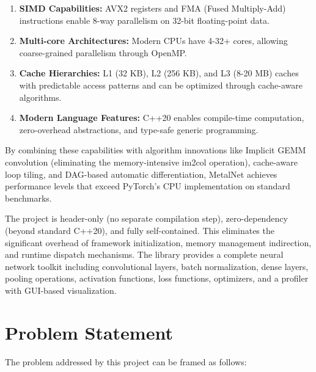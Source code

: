 \documentclass[12pt,oneside,a4paper]{report}
\begin{document}
\begin{enumerate}
    \item \textbf{SIMD Capabilities:} AVX2 registers and FMA (Fused Multiply-Add) instructions enable 8-way parallelism on 32-bit floating-point data.
    \item \textbf{Multi-core Architectures:} Modern CPUs have 4-32+ cores, allowing coarse-grained parallelism through OpenMP.
    \item \textbf{Cache Hierarchies:} L1 (32 KB), L2 (256 KB), and L3 (8-20 MB) caches with predictable access patterns and can be optimized through cache-aware algorithms.
    \item \textbf{Modern Language Features:} C++20 enables compile-time computation, zero-overhead abstractions, and type-safe generic programming.
\end{enumerate}

By combining these capabilities with algorithm innovations like Implicit GEMM convolution (eliminating the memory-intensive im2col operation), cache-aware loop tiling, and DAG-based automatic differentiation, MetalNet achieves performance levels that exceed PyTorch's CPU implementation on standard benchmarks.

The project is header-only (no separate compilation step), zero-dependency (beyond standard C++20), and fully self-contained. This eliminates the significant overhead of framework initialization, memory management indirection, and runtime dispatch mechanisms. The library provides a complete neural network toolkit including convolutional layers, batch normalization, dense layers, pooling operations, activation functions, loss functions, optimizers, and a profiler with GUI-based visualization.

\section{Problem Statement}

The problem addressed by this project can be framed as follows:
\end{document}
